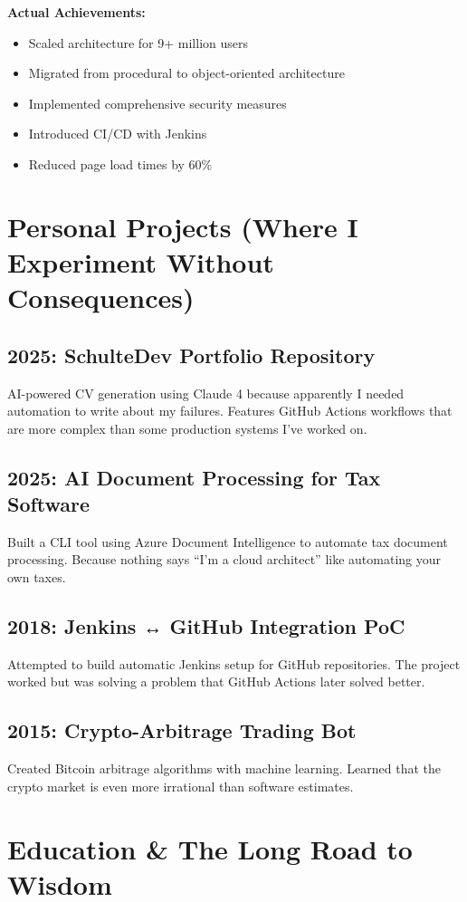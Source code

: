 \documentclass[10pt,a4paper]{article}
\begin{document}
\textbf{Actual Achievements:}
\begin{itemize}
    \item Scaled architecture for 9+ million users
    \item Migrated from procedural to object-oriented architecture
    \item Implemented comprehensive security measures
    \item Introduced CI/CD with Jenkins
    \item Reduced page load times by 60\%
\end{itemize}

\section{Personal Projects (Where I Experiment Without Consequences)}

\subsection{2025: SchulteDev Portfolio Repository}
AI-powered CV generation using Claude 4 because apparently I needed automation to write about my failures. Features GitHub Actions workflows that are more complex than some production systems I've worked on.

\subsection{2025: AI Document Processing for Tax Software}
Built a CLI tool using Azure Document Intelligence to automate tax document processing. Because nothing says ``I'm a cloud architect'' like automating your own taxes.

\subsection{2018: Jenkins ↔ GitHub Integration PoC}
Attempted to build automatic Jenkins setup for GitHub repositories. The project worked but was solving a problem that GitHub Actions later solved better.

\subsection{2015: Crypto-Arbitrage Trading Bot}
Created Bitcoin arbitrage algorithms with machine learning. Learned that the crypto market is even more irrational than software estimates.

\section{Education \& The Long Road to Wisdom}
\end{document}

